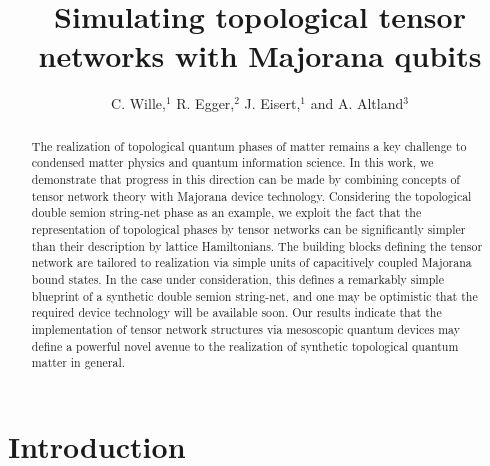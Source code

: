 \documentclass[twocolumn,floats,prx,showpacs]{revtex4-1}
\begin{document}
\title{Simulating topological tensor networks with Majorana qubits} 

\author{C. Wille,$^1$ R. Egger,$^2$ J. Eisert,$^1$ and A. Altland$^3$}

\begin{abstract}
The realization of topological quantum phases of matter remains a key challenge to condensed matter physics and quantum information science. In this work, we  demonstrate that progress in this direction can be made by combining concepts of tensor network theory with Majorana device technology. Considering the topological double semion string-net phase as an example, we exploit the fact that the representation of topological phases by tensor networks can be significantly simpler than their description by lattice Hamiltonians. The building blocks defining the tensor network are tailored to realization via simple units of capacitively coupled Majorana bound states. In the case under consideration,  this defines a remarkably simple blueprint of a synthetic double semion string-net, and one may be optimistic that the required device technology will be available soon.  Our results indicate that the implementation of  tensor network structures via mesoscopic quantum devices may define a powerful novel avenue to the realization of synthetic topological quantum matter in general.
\end{abstract}
\maketitle

\section{Introduction}
\end{document}
